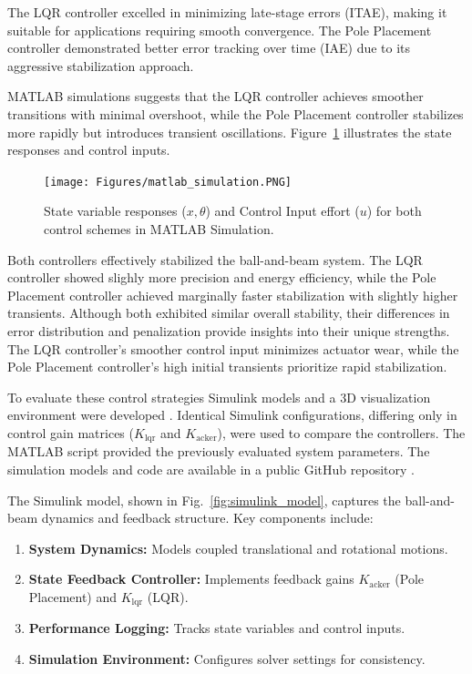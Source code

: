 \documentclass[conference]{IEEEtran}
\begin{document}
The LQR controller excelled in minimizing late-stage errors (ITAE), making it suitable for applications requiring smooth convergence. The Pole Placement controller demonstrated better error tracking over time (IAE) due to its aggressive stabilization approach.

MATLAB simulations suggests that the LQR controller achieves smoother transitions with minimal overshoot, while the Pole Placement controller stabilizes more rapidly but introduces transient oscillations. Figure~\ref{fig:state_sim} illustrates the state responses and control inputs.

\begin{figure}[H]
    \centering
    \texttt{[image: Figures/matlab\_simulation.PNG]}
    \caption{State variable responses (\(x, \theta\)) and Control Input effort (\(u\)) for both control schemes in MATLAB Simulation.}
    \label{fig:state_sim}
\end{figure}

Both controllers effectively stabilized the ball-and-beam system. The LQR controller showed slighly more precision and energy efficiency, while the Pole Placement controller achieved marginally faster stabilization with slightly higher transients. Although both exhibited similar overall stability, their differences in error distribution and penalization provide insights into their unique strengths. The LQR controller's smoother control input minimizes actuator wear, while the Pole Placement controller’s high initial transients prioritize rapid stabilization.

To evaluate these control strategies Simulink models and a 3D visualization environment were developed \cite{ball_beam_simulink}. Identical Simulink configurations, differing only in control gain matrices (\(K_{\text{lqr}}\) and \(K_{\text{acker}}\)), were used to compare the controllers. The MATLAB script provided the previously evaluated system parameters. The simulation models and code are available in a public GitHub repository \cite{github_repo}.

The Simulink model, shown in Fig.~\ref{fig:simulink_model}, captures the ball-and-beam dynamics and feedback structure. Key components include:
\begin{enumerate}
    \item \textbf{System Dynamics:} Models coupled translational and rotational motions.
    \item \textbf{State Feedback Controller:} Implements feedback gains \(K_{\text{acker}}\) (Pole Placement) and \(K_{\text{lqr}}\) (LQR).
    \item \textbf{Performance Logging:} Tracks state variables and control inputs.
    \item \textbf{Simulation Environment:} Configures solver settings for consistency.
\end{enumerate}
\end{document}
